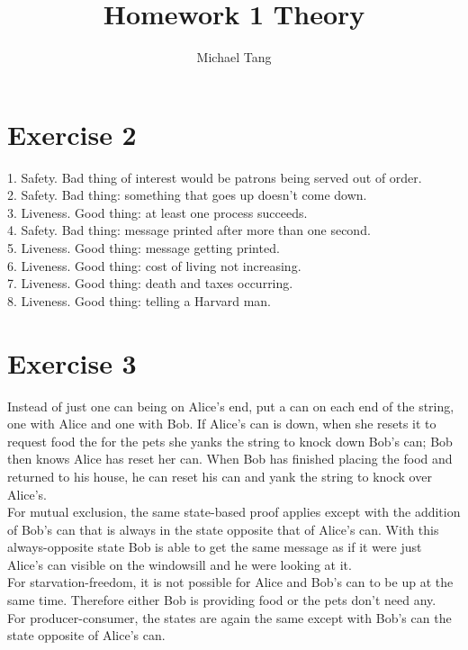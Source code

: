\documentclass{article}
\title{Homework 1 Theory}
\author{Michael Tang}
\begin{document}
\maketitle
{}
\begin{adjustwidth}{-2cm}{-2cm}

\section{Exercise 2}
1. Safety. Bad thing of interest would be patrons being served out of order.\\
2. Safety. Bad thing: something that goes up doesn't come down.\\
3. Liveness. Good thing: at least one process succeeds.\\
4. Safety. Bad thing: message printed after more than one second.\\
5. Liveness. Good thing: message getting printed.\\
6. Liveness. Good thing: cost of living not increasing.\\
7. Liveness. Good thing: death and taxes occurring.\\
8. Liveness. Good thing: telling a Harvard man.

\section{Exercise 3}
Instead of just one can being on Alice's end, put a can on each end of the string, one with Alice and one with Bob. If Alice's can is down, when she resets it to request food the for the pets she yanks the string to knock down Bob's can; Bob then knows Alice has reset her can. When Bob has finished placing the food and returned to his house, he can reset his can and yank the string to knock over Alice's.\\
For mutual exclusion, the same state-based proof applies except with the addition of Bob's can that is always in the state opposite that of Alice's can. With this always-opposite state Bob is able to get the same message as if it were just Alice's can visible on the windowsill and he were looking at it.\\
For starvation-freedom, it is not possible for Alice and Bob's can to be up at the same time. Therefore either Bob is providing food or the pets don't need any.\\
For producer-consumer, the states are again the same except with Bob's can the state opposite of Alice's can.


\end{adjustwidth}
\end{document}
